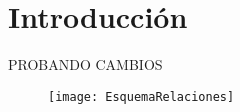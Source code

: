 \chapter{Introducción}

PROBANDO CAMBIOS

\begin{figure}[h!]
	\texttt{[image: EsquemaRelaciones]}
	\centering
\end{figure}